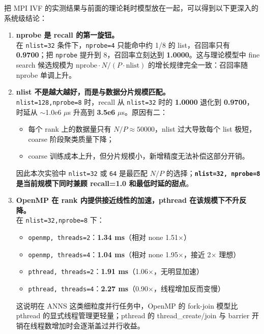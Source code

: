 \documentclass[a4paper]{article}
\begin{document}
把 MPI IVF 的实测结果与前面的理论耗时模型放在一起，可以得到以下更深入的系统级结论：

\begin{enumerate}
    \item \textbf{nprobe 是 recall 的第一旋钮。}\\
    在 \texttt{nlist=32} 条件下，\texttt{nprobe=4} 只能命中约 1/8 的 list，召回率只有 \textbf{0.9700}；把 \texttt{nprobe} 提升到 8，召回率立刻达到 \textbf{1.0000}。这与理论模型中 fine search 候选规模为 $\text{nprobe} \cdot N/(P \cdot \text{nlist})$ 的增长规律完全一致：召回率随 nprobe 单调上升。

    \item \textbf{nlist 不是越大越好，而是与数据分片规模匹配。}\\
    \texttt{nlist=128,nprobe=8} 时，recall 从 \texttt{nlist=32} 时的 \textbf{1.0000} 退化到 \textbf{0.9700}，时延从 $\sim$1.0e6 $\mu$s 升高到 \textbf{3.5e6} $\mu$s。原因有二：
    \begin{itemize}
        \item 每个 rank 上的数据量只有 $N/P \approx 50000$，nlist 过大导致每个 list 极短，coarse 阶段聚类质量下降；
        \item coarse 训练成本上升，但分片规模小，新增精度无法补偿这部分开销。
    \end{itemize}
    因此本次实验中 \texttt{nlist=32} 或 \texttt{64} 是最匹配 $N/P$ 的选择；\textbf{\texttt{nlist=32, nprobe=8} 是当前规模下同时兼顾 recall=1.0 和最低时延的甜点}。

    \item \textbf{OpenMP 在 rank 内提供接近线性的加速，pthread 在该规模下不升反降。}\\
    在 \texttt{nlist=32,nprobe=8} 下：
    \begin{itemize}
        \item \texttt{openmp, threads=2}：\textbf{1.34 ms}（相对 none 1.51$\times$）
        \item \texttt{openmp, threads=4}：\textbf{1.04 ms}（相对 none 1.95$\times$，接近 2$\times$ 理想）
        \item \texttt{pthread, threads=2}：\textbf{1.91 ms}（1.06$\times$，无明显加速）
        \item \texttt{pthread, threads=4}：\textbf{2.27 ms}（0.90$\times$，线程增加反而变慢）
    \end{itemize}
    这说明在 ANNS 这类细粒度并行任务中，OpenMP 的 fork-join 模型比 pthread 的显式线程管理更轻量；pthread 的 thread\_create/join 与 barrier 开销在线程数增加时会逐渐盖过并行收益。


\end{enumerate}
\end{document}
